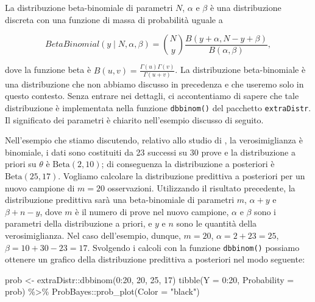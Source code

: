 \documentclass[
  11pt,
]{krantz}
\makeatletter
\newenvironment{Shaded}{\begin{snugshade}}{\end{snugshade}}
\newcommand{\AttributeTok}[1]{\textcolor[rgb]{0.61,0.61,0.61}{#1}}
\newcommand{\DecValTok}[1]{\textcolor[rgb]{0.06,0.06,0.06}{#1}}
\newcommand{\FunctionTok}[1]{\textcolor[rgb]{0,0,0}{#1}}
\newcommand{\NormalTok}[1]{#1}
\newcommand{\OtherTok}[1]{\textcolor[rgb]{0.37,0.37,0.37}{#1}}
\newcommand{\SpecialCharTok}[1]{\textcolor[rgb]{0,0,0}{#1}}
\newcommand{\StringTok}[1]{\textcolor[rgb]{0.5,0.5,0.5}{#1}}
\newenvironment{kframe}{%
\medskip{}
\setlength{\fboxsep}{.8em}
 \def\at@end@of@kframe{}%
 \ifinner\ifhmode%
  \def\at@end@of@kframe{\end{minipage}}%
  \begin{minipage}{\columnwidth}%
 \fi\fi%
 \def\FrameCommand##1{\hskip\@totalleftmargin \hskip-\fboxsep
 \colorbox{shadecolor}{##1}\hskip-\fboxsep
     \hskip-\linewidth \hskip-\@totalleftmargin \hskip\columnwidth}%
 \MakeFramed {\advance\hsize-\width
   \@totalleftmargin\z@ \linewidth\hsize
   \@setminipage}}%
 {\par\unskip\endMakeFramed%
 \at@end@of@kframe}
\renewenvironment{Shaded}{\begin{kframe}}{\end{kframe}}
\theoremstyle{definition}
\theoremstyle{definition}
\theoremstyle{definition}
\theoremstyle{definition}
\theoremstyle{remark}
\makeatother
\begin{document}
La distribuzione beta-binomiale di parametri \(N\), \(\alpha\) e \(\beta\) è una distribuzione discreta con una funzione di massa di probabilità uguale a

\[
BetaBinomial(y \mid N, \alpha, \beta) = \binom{N}{y} \frac{B(y + \alpha, N-y+\beta)}{B(\alpha, \beta)},
\]

dove la funzione beta è \(B(u, v) = \frac{\Gamma(u)\Gamma(v)}{\Gamma(u+v)}\). La distribuzione beta-binomiale è una distribuzione che non abbiamo discusso in precedenza e che useremo solo in questo contesto. Senza entrare nei dettagli, ci accontentiamo di sapere che tale distribuzione è implementata nella funzione \texttt{dbbinom()} del pacchetto \texttt{extraDistr}. Il significato dei parametri è chiarito nell'esempio discusso di seguito.

Nell'esempio che stiamo discutendo, relativo allo studio di \citet{zetschefuture2019}, la verosimiglianza è binomiale, i dati sono costituiti da 23 successi su 30 prove e la distribuzione a priori su \(\theta\) è \(\mbox{Beta}(2, 10)\); di conseguenza la distribuzione a posteriori è \(\mbox{Beta}(25, 17)\). Vogliamo calcolare la distribuzione predittiva a posteriori per un nuovo campione di \(m = 20\) osservazioni. Utilizzando il risultato precedente, la distribuzione predittiva sarà una beta-binomiale di parametri \(m\), \(\alpha+y\) e \(\beta+n-y\), dove \(m\) è il numero di prove nel nuovo campione, \(\alpha\) e \(\beta\) sono i parametri della distribuzione a priori, e \(y\) e \(n\) sono le quantità della verosimiglianza. Nel caso dell'esempio, dunque, \(m = 20\), \(\alpha = 2 + 23 = 25\), \(\beta = 10 + 30 - 23 = 17\). Svolgendo i calcoli con la funzione \texttt{dbbinom()} possiamo ottenere un grafico della distribuzione predittiva a posteriori nel modo seguente:

\begin{Shaded}
\begin{Highlighting}[]
\NormalTok{prob }\OtherTok{\textless{}{-}}\NormalTok{ extraDistr}\SpecialCharTok{::}\FunctionTok{dbbinom}\NormalTok{(}\DecValTok{0}\SpecialCharTok{:}\DecValTok{20}\NormalTok{, }\DecValTok{20}\NormalTok{, }\DecValTok{25}\NormalTok{, }\DecValTok{17}\NormalTok{)}
\FunctionTok{tibble}\NormalTok{(}\AttributeTok{Y =} \DecValTok{0}\SpecialCharTok{:}\DecValTok{20}\NormalTok{, }\AttributeTok{Probability =}\NormalTok{ prob) }\SpecialCharTok{\%\textgreater{}\%}
\NormalTok{  ProbBayes}\SpecialCharTok{::}\FunctionTok{prob\_plot}\NormalTok{(}\AttributeTok{Color =} \StringTok{"black"}\NormalTok{)}
\end{Highlighting}
\end{Shaded}
\end{document}
